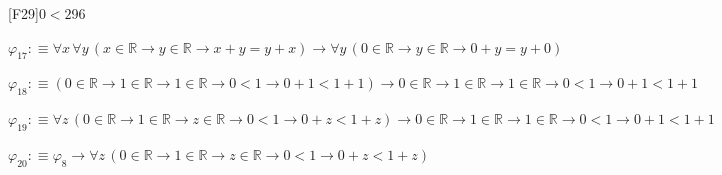 \begin{fullproof}{[F29]}{$0 < 2$}{96}
\begin{abbrevlist}
\item $\varphi_{17} :\equiv \forall x\,\forall y\,(x \in \mathbb{R} \to y \in \mathbb{R} \to x + y = y + x) \to \forall y\,(0 \in \mathbb{R} \to y \in \mathbb{R} \to 0 + y = y + 0)$
\item $\varphi_{18} :\equiv (0 \in \mathbb{R} \to 1 \in \mathbb{R} \to 1 \in \mathbb{R} \to 0 < 1 \to 0 + 1 < 1 + 1) \to 0 \in \mathbb{R} \to 1 \in \mathbb{R} \to 1 \in \mathbb{R} \to 0 < 1 \to 0 + 1 < 1 + 1$
\item $\varphi_{19} :\equiv \forall z\,(0 \in \mathbb{R} \to 1 \in \mathbb{R} \to z \in \mathbb{R} \to 0 < 1 \to 0 + z < 1 + z) \to 0 \in \mathbb{R} \to 1 \in \mathbb{R} \to 1 \in \mathbb{R} \to 0 < 1 \to 0 + 1 < 1 + 1$
\item $\varphi_{20} :\equiv \varphi_{8} \to \forall z\,(0 \in \mathbb{R} \to 1 \in \mathbb{R} \to z \in \mathbb{R} \to 0 < 1 \to 0 + z < 1 + z)$
\end{abbrevlist}
\end{fullproof}
